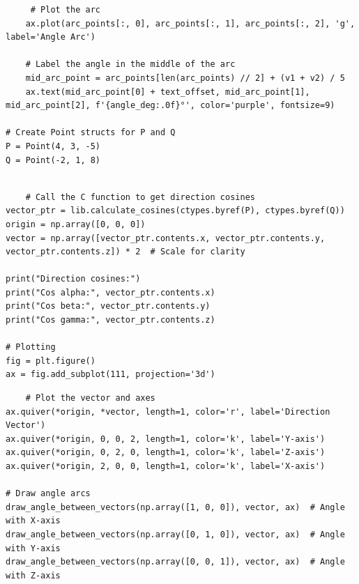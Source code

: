 \documentclass{beamer}
\theoremstyle{remark}
\begin{document}
\begin{frame}[fragile]
	 \begin{verbatim}
     # Plot the arc
    ax.plot(arc_points[:, 0], arc_points[:, 1], arc_points[:, 2], 'g', label='Angle Arc')

    # Label the angle in the middle of the arc
    mid_arc_point = arc_points[len(arc_points) // 2] + (v1 + v2) / 5
    ax.text(mid_arc_point[0] + text_offset, mid_arc_point[1], mid_arc_point[2], f'{angle_deg:.0f}°', color='purple', fontsize=9)

# Create Point structs for P and Q
P = Point(4, 3, -5)
Q = Point(-2, 1, 8)


    \end{verbatim}
\end{frame}
\begin{frame}[fragile]
	 \begin{verbatim}
	# Call the C function to get direction cosines
vector_ptr = lib.calculate_cosines(ctypes.byref(P), ctypes.byref(Q))
origin = np.array([0, 0, 0])
vector = np.array([vector_ptr.contents.x, vector_ptr.contents.y, vector_ptr.contents.z]) * 2  # Scale for clarity

print("Direction cosines:")
print("Cos alpha:", vector_ptr.contents.x)
print("Cos beta:", vector_ptr.contents.y)
print("Cos gamma:", vector_ptr.contents.z)

# Plotting
fig = plt.figure()
ax = fig.add_subplot(111, projection='3d')
    \end{verbatim}
\end{frame}
\begin{frame}[fragile]
	 \begin{verbatim}
	# Plot the vector and axes
ax.quiver(*origin, *vector, length=1, color='r', label='Direction Vector')
ax.quiver(*origin, 0, 0, 2, length=1, color='k', label='Y-axis')
ax.quiver(*origin, 0, 2, 0, length=1, color='k', label='Z-axis')
ax.quiver(*origin, 2, 0, 0, length=1, color='k', label='X-axis')

# Draw angle arcs
draw_angle_between_vectors(np.array([1, 0, 0]), vector, ax)  # Angle with X-axis
draw_angle_between_vectors(np.array([0, 1, 0]), vector, ax)  # Angle with Y-axis
draw_angle_between_vectors(np.array([0, 0, 1]), vector, ax)  # Angle with Z-axis
	
    \end{verbatim}
\end{frame}
\end{document}
